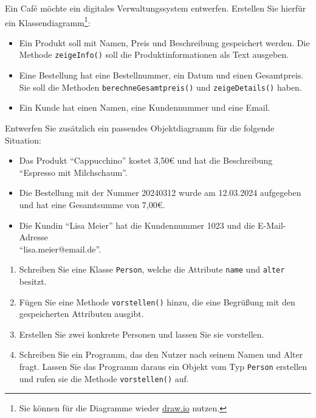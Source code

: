 \documentclass[11pt, a4paper, oneside]{article}
\begin{document}
	
	
	
	Ein Café möchte ein digitales Verwaltungssystem entwerfen.
	Erstellen Sie hierfür ein Klassendiagramm\footnote{Sie können für die Diagramme wieder \href{https://draw.io}{draw.io} nutzen.}:
	
	\begin{itemize}
		\item Ein Produkt soll mit Namen, Preis und Beschreibung gespeichert werden.
		Die Methode \texttt{zeigeInfo()} soll die Produktinformationen als Text ausgeben.
		\item Eine Bestellung hat eine Bestellnummer, ein Datum und einen Gesamtpreis.
		Sie soll die Methoden \texttt{berechneGesamtpreis()} und \texttt{zeigeDetails()} haben.
		\item Ein Kunde hat einen Namen, eine Kundennummer und eine Email.
	\end{itemize}

	Entwerfen Sie zusätzlich ein passendes Objektdiagramm für die folgende Situation:
	
	\begin{itemize}
		\item Das Produkt ``Cappucchino'' kostet 3,50€ und hat die Beschreibung ``Espresso mit Milchschaum''.
		\item Die Bestellung mit der Nummer 20240312 wurde am 12.03.2024 aufgegeben und hat eine Gesamtsumme von 7,00€.
		\item Die Kundin ``Lisa Meier'' hat die Kundennummer 1023 und die E-Mail-Adresse\\ ``lisa.meier@email.de''.
	\end{itemize}


	\begin{enumerate}[label=\alph*)]
		\item Schreiben Sie eine Klasse \texttt{Person}, welche die Attribute \texttt{name} und \texttt{alter} besitzt.
		\item Fügen Sie eine Methode \texttt{vorstellen()} hinzu, die eine Begrüßung mit den gespeicherten Attributen ausgibt.
		\item Erstellen Sie zwei konkrete Personen und lassen Sie sie vorstellen.
		\item Schreiben Sie ein Programm, das den Nutzer nach seinem Namen und Alter fragt.
		Lassen Sie das Programm daraus ein Objekt vom Typ \texttt{Person} erstellen und rufen sie die Methode \texttt{vorstellen()} auf.
	\end{enumerate}
\end{document}
